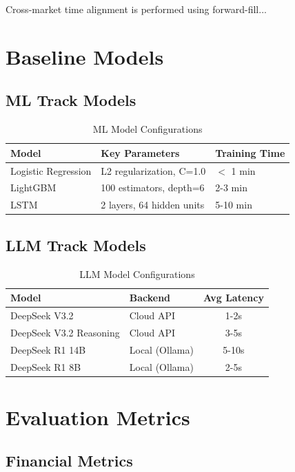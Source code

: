 Cross-market time alignment is performed using forward-fill...

\section{Baseline Models}

\subsection{ML Track Models}

\begin{table}[h]
\centering
\caption{ML Model Configurations}
\begin{tabular}{lll}
\toprule
Model & Key Parameters & Training Time \\
\midrule
Logistic Regression & L2 regularization, C=1.0 & $<$ 1 min \\
LightGBM & 100 estimators, depth=6 & 2-3 min \\
LSTM & 2 layers, 64 hidden units & 5-10 min \\
\bottomrule
\end{tabular}
\end{table}

\subsection{LLM Track Models}

\begin{table}[h]
\centering
\caption{LLM Model Configurations}
\begin{tabular}{llc}
\toprule
Model & Backend & Avg Latency \\
\midrule
DeepSeek V3.2 & Cloud API & 1-2s \\
DeepSeek V3.2 Reasoning & Cloud API & 3-5s \\
DeepSeek R1 14B & Local (Ollama) & 5-10s \\
DeepSeek R1 8B & Local (Ollama) & 2-5s \\
\bottomrule
\end{tabular}
\end{table}

\section{Evaluation Metrics}

\subsection{Financial Metrics}


